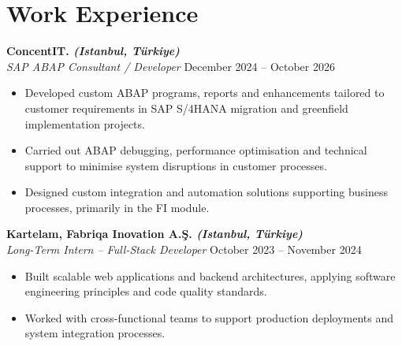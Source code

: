 \documentclass[10pt,a4paper]{extarticle}
\begin{document}
\section{Work Experience}
\textbf{ConcentIT. \textit{(Istanbul, Türkiye)}}\\
\textit{SAP ABAP Consultant / Developer} \hfill December 2024 -- October 2026
\begin{itemize}[leftmargin=*,noitemsep,topsep=0pt]
    \item Developed custom ABAP programs, reports and enhancements tailored to customer requirements in SAP S/4HANA migration and greenfield implementation projects.
    \item Carried out ABAP debugging, performance optimisation and technical support to minimise system disruptions in customer processes.
    \item Designed custom integration and automation solutions supporting business processes, primarily in the FI module.
\end{itemize}
\textbf{Kartelam, Fabriqa Inovation A.Ş. \textit{(Istanbul, Türkiye)}}\\
\textit{Long-Term Intern -- Full-Stack Developer} \hfill October 2023 -- November 2024
\begin{itemize}[leftmargin=*,noitemsep,topsep=0pt]
    \item Built scalable web applications and backend architectures, applying software engineering principles and code quality standards.
    \item Worked with cross-functional teams to support production deployments and system integration processes.
\end{itemize}
\end{document}

